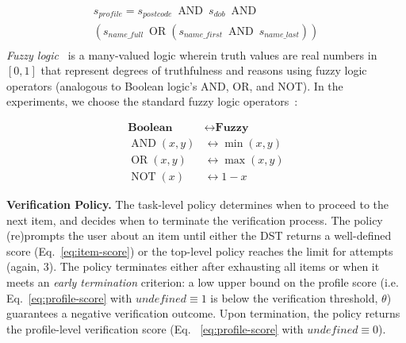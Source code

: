 \documentclass[11pt]{article}
\newcommand{\opAnd}{\operatorname{AND}}
\newcommand{\opOr}{\operatorname{OR}}
\newcommand{\opNot}{\operatorname{NOT}}
\newcommand{\sparagraph}[1]{\noindent\textbf{#1.}}
\begin{document}
{{\small
\begin{equation}
\begin{gathered}
s_\textit{profile} =
s_\textit{postcode} \ \opAnd \ s_\textit{dob} \ \opAnd \\
(s_\textit{name\_full} \ \opOr (s_\textit{name\_first} \ \opAnd \ s_\textit{name\_last})) \\
\end{gathered}
\label{eq:profile-score}
\end{equation}}\textit{Fuzzy logic}~\cite{zadeh1996fuzzy}
is a many-valued logic wherein truth values are real numbers in $[0,1]$ that represent degrees of truthfulness and reasons using fuzzy logic operators (analogous to Boolean logic's AND, OR, and NOT).
In the experiments, we choose the standard fuzzy logic operators~\cite{zadeh1996fuzzy}:

{\small
\begin{equation}
\begin{aligned}
\textbf{Boolean}      & \longleftrightarrow \textbf{Fuzzy} \\
\opAnd (x,y) & \longleftrightarrow \min(x,y) \\
\opOr (x,y)  & \longleftrightarrow \max(x,y) \\
\opNot (x)   & \longleftrightarrow 1 - x
\end{aligned} \label{eq:logic-zadeh}
\end{equation}}

\sparagraph{Verification Policy}
The task-level policy
determines when to proceed to the next item,
and decides when to terminate the verification process.
The policy
(re)prompts the user about an item
until
either the DST returns a well-defined score (Eq.~\ref{eq:item-score})
or the top-level policy reaches the limit for attempts
(again, $3$).
The policy terminates
either
after exhausting all items
or when it meets an \textit{early termination} criterion:
a low upper bound on the profile score
(i.e. Eq.~\ref{eq:profile-score} with $\textit{undefined} \equiv 1$ is below the verification threshold, $\theta$)
guarantees a negative verification outcome.
Upon termination, the policy returns the profile-level verification score (Eq. ~\ref{eq:profile-score} with $\textit{undefined} \equiv 0$).




}
\end{document}
